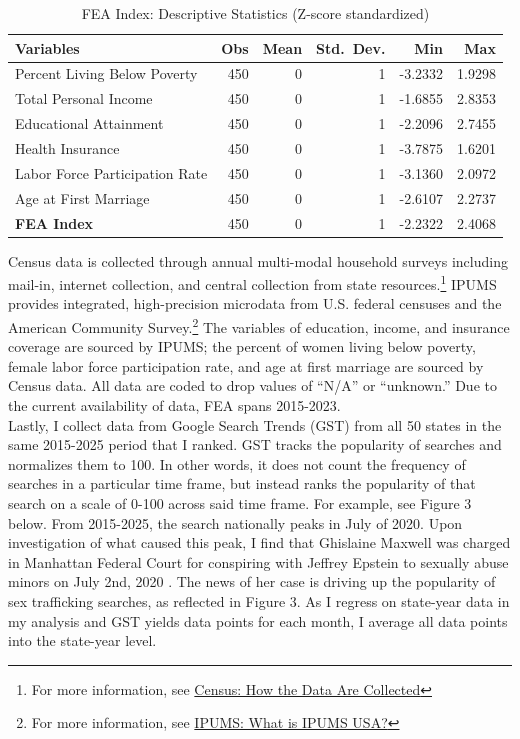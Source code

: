 \begin{table}[H]

\centering
\begin{tabular}{lrrrrr}

Variables & Obs & Mean & Std.\ Dev. & Min & Max \\
\midrule
Percent Living Below Poverty & 450 & 0 & 1 & -3.2332 & 1.9298 \\
Total Personal Income & 450 & 0 & 1 & -1.6855 & 2.8353 \\
Educational Attainment & 450 & 0 & 1 & -2.2096 & 2.7455 \\
Health Insurance & 450 & 0 & 1 & -3.7875 & 1.6201 \\
Labor Force Participation Rate & 450 & 0 & 1 & -3.1360 & 2.0972 \\
Age at First Marriage & 450 & 0 & 1 & -2.6107 & 2.2737 \\
\textbf{FEA Index} & 450 & 0 & 1 & -2.2322 & 2.4068 \\
\bottomrule
\end{tabular}
\caption{FEA Index: Descriptive Statistics (Z-score standardized)}
\end{table}
\indent Census data is collected through annual multi-modal household surveys including mail-in, internet collection, and central collection from state resources.\footnote{For more information, see \href{https://www.census.gov/programs-surveys/gov-finances/technical-documentation/methodology/how-the-data-are-collected.html}{Census: How the Data Are Collected}} IPUMS provides integrated, high-precision microdata from U.S. federal censuses and the American Community Survey.\footnote{For more information, see \href{https://usa.ipums.org/usa/intro.shtml}{IPUMS: What is IPUMS USA?}} The variables of education, income, and insurance coverage are sourced by IPUMS; the percent of women living below poverty, female labor force participation rate, and age at first marriage are sourced by Census data. All data are coded to drop values of ``N/A'' or ``unknown.'' Due to the current availability of data, FEA spans 2015-2023. \\
\indent Lastly, I collect data from Google Search Trends (GST) from all 50 states in the same 2015-2025 period that I ranked. GST tracks the popularity of searches and normalizes them to 100. In other words, it does not count the frequency of searches in a particular time frame, but instead ranks the popularity of that search on a scale of 0-100 across said time frame. For example, see Figure 3 below. From 2015-2025, the search nationally peaks in July of 2020. Upon investigation of what caused this peak, I find that Ghislaine Maxwell was charged in Manhattan Federal Court for conspiring with Jeffrey Epstein to sexually abuse minors on July 2nd, 2020 \citep{sdny_maxwell2020}. The news of her case is driving up the popularity of sex trafficking searches, as reflected in Figure 3. As I regress on state-year data in my analysis and GST yields data points for each month, I average all data points into the state-year level. \\
